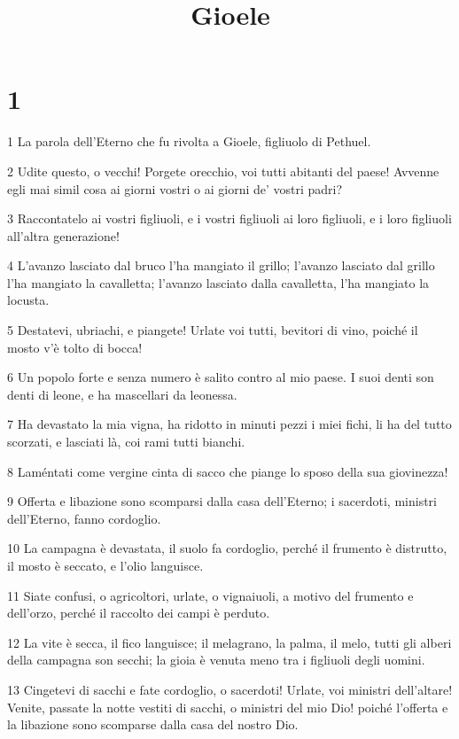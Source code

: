 

\title{Gioele}


\chapter{1}

\par 1 La parola dell'Eterno che fu rivolta a Gioele, figliuolo di Pethuel.
\par 2 Udite questo, o vecchi! Porgete orecchio, voi tutti abitanti del paese! Avvenne egli mai simil cosa ai giorni vostri o ai giorni de' vostri padri?
\par 3 Raccontatelo ai vostri figliuoli, e i vostri figliuoli ai loro figliuoli, e i loro figliuoli all'altra generazione!
\par 4 L'avanzo lasciato dal bruco l'ha mangiato il grillo; l'avanzo lasciato dal grillo l'ha mangiato la cavalletta; l'avanzo lasciato dalla cavalletta, l'ha mangiato la locusta.
\par 5 Destatevi, ubriachi, e piangete! Urlate voi tutti, bevitori di vino, poiché il mosto v'è tolto di bocca!
\par 6 Un popolo forte e senza numero è salito contro al mio paese. I suoi denti son denti di leone, e ha mascellari da leonessa.
\par 7 Ha devastato la mia vigna, ha ridotto in minuti pezzi i miei fichi, li ha del tutto scorzati, e lasciati là, coi rami tutti bianchi.
\par 8 Laméntati come vergine cinta di sacco che piange lo sposo della sua giovinezza!
\par 9 Offerta e libazione sono scomparsi dalla casa dell'Eterno; i sacerdoti, ministri dell'Eterno, fanno cordoglio.
\par 10 La campagna è devastata, il suolo fa cordoglio, perché il frumento è distrutto, il mosto è seccato, e l'olio languisce.
\par 11 Siate confusi, o agricoltori, urlate, o vignaiuoli, a motivo del frumento e dell'orzo, perché il raccolto dei campi è perduto.
\par 12 La vite è secca, il fico languisce; il melagrano, la palma, il melo, tutti gli alberi della campagna son secchi; la gioia è venuta meno tra i figliuoli degli uomini.
\par 13 Cingetevi di sacchi e fate cordoglio, o sacerdoti! Urlate, voi ministri dell'altare! Venite, passate la notte vestiti di sacchi, o ministri del mio Dio! poiché l'offerta e la libazione sono scomparse dalla casa del nostro Dio.

